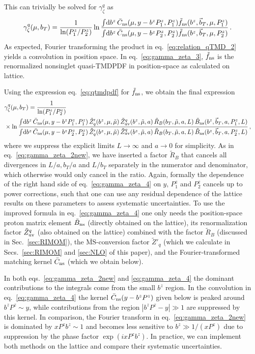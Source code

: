 \documentclass[11pt,a4paper]{article}
\DeclareRobustCommand{\eq}[1]{eq.~\eqref{eq:#1}}
\DeclareRobustCommand{\eqs}[2]{eqs.~\eqref{eq:#1} and \eqref{eq:#2}}
\DeclareRobustCommand{\sec}[1]{Sec.~\ref{sec:#1}}
\DeclareRobustCommand{\secs}[2]{Secs.~\ref{sec:#1} and \ref{sec:#2}}
\newcommand{\MS}{{\overline{\mathrm{MS}}}}
\newcommand{\df}{\mathrm{d}}
\newcommand{\cR}{{\tilde R}}
\newcommand{\nn}{\nonumber}
\newcommand{\bt}{\vec b_T}
\newcommand{\ns}{{\rm ns}}
\begin{document}
This can trivially be solved for $\gamma_\zeta^q$ as
\begin{align} \label{eq:gamma_zeta_3}
 \gamma_\zeta^q(\mu, b_T) = \frac{1}{\ln(P^z_1/P^z_2)}
 \ln\frac{\int\!\df b^z \, \bar C_\ns(\mu, y - b^z P^z_1, P^z_1) \tilde f_\ns(b^z, \bt, \mu, P^z_1)}
         {\int\!\df b^z \, \bar C_\ns(\mu, y - b^z P^z_2, P^z_2) \tilde f_\ns(b^z, \bt, \mu, P^z_2)}
\,.\end{align}
As expected, Fourier transforming the product in \eq{relation_qTMD_2} yields a convolution in position space.
In \eq{gamma_zeta_3}, $\tilde f_\ns$ is the renormalized nonsinglet quasi-TMDPDF in position-space as calculated on lattice.

Using the expression \eq{qtmdpdf} for $\tilde f_\ns$, we obtain the final expression
\begin{align} \label{eq:gamma_zeta_4}
 &\gamma_\zeta^q(\mu, b_T) = \frac{1}{\ln(P^z_1/P^z_2)}
 \\\nn
&\times
 \ln\frac{\int\!\df b^z \, \bar C_\ns(\mu, y - b^z P^z_1,P^z_1)\, \tilde Z'_q(b^z,\mu,\tilde \mu)\,
 	\tilde Z_{\rm uv}^q(b^z, \tilde \mu, a) \, \cR_B(b_T,\tilde\mu,a,L) \, \tilde B_{\rm ns}(b^z, \bt, a, P^z_1, L)}
    {\int\!\df b^z \, \bar C_\ns(\mu, y - b^z P^z_2, P^z_2)\, \tilde Z'_q(b^z,\mu,\tilde \mu)\,
    \tilde Z_{\rm uv}^q(b^z, \tilde \mu, a) \, \cR_B(b_T,\tilde\mu,a,L) \,  \tilde B_{\rm ns}(b^z, \bt, a, P^z_2, L)}
\,,\end{align}
where we suppress the explicit limits $L\to\infty$ and $a\to0$ for simplicity.
As in \eq{gamma_zeta_2new}, we have inserted a factor $\cR_B$ that cancels all divergences in $L/a, b_T/a$ and $L/b_T$ separately in the numerator and denominator, which otherwise would only cancel in the ratio.
Again, formally the dependence of the right hand side of \eq{gamma_zeta_4} on $y$, $P^z_1$ and $P^z_2$ cancels up to power corrections, such that one can use any residual dependence of the lattice results on these parameters to assess systematic uncertainties.
To use the improved formula in \eq{gamma_zeta_4} one only needs the position-space proton matrix element $\tilde B_{\rm ns}$ (directly obtained on the lattice),
its renormalization factor $\tilde Z_{\rm uv}^q$ (also obtained on the lattice) combined with
the factor $\cR_B$ (discussed in \sec{RIMOM}),
the $\MS$-conversion factor $\tilde Z'_q$
(which we calculate in \secs{RIMOM}{NLO} of this paper),
and the Fourier-transformed matching kernel $\bar C_\ns$ (which we obtain below).

In both \eqs{gamma_zeta_2new}{gamma_zeta_4} the dominant contributions to the integrals come from the small $b^z$ region. 
In the convolution in \eq{gamma_zeta_4} the kernel $\bar C_\ns(y - b^z P^z)$ given below is peaked around $b^z P^z\sim y$, while contributions from the region $|b^zP^z-y|\gg1$ are suppressed by this kernel.
In comparison, the Fourier transform in \eq{gamma_zeta_2new} is dominated by $xP^z b^z\sim 1$ and becomes less sensitive to $b^z\gg 1/(xP^z)$ due to suppression by the phase factor $\exp(ixP^zb^z)$. In practice, we can implement both methods on the lattice and compare their systematic uncertainties.
\end{document}
